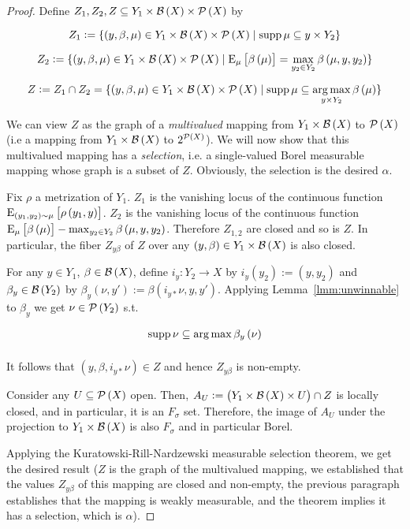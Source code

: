 \begin{proof}

Define ${Z_1, Z_2, Z \subseteq Y_1 \times \mathcal{B}\left(X\right) \times \mathcal{P}\left(X\right)}$ by

$${Z_1:=\{\left(y,\beta,\mu\right) \in Y_1 \times \mathcal{B}\left(X\right) \times \mathcal{P}\left(X\right) \mid \operatorname{supp} \mu \subseteq y \times Y_2\}}$$

$${Z_2:=\{\left(y,\beta,\mu\right) \in Y_1 \times \mathcal{B}\left(X\right) \times \mathcal{P}\left(X\right) \mid \operatorname{E}_\mu\left[\beta\left(\mu\right)\right] = \max_{y_2 \in Y_2} \beta\left(\mu,y,y_2\right)\}}$$

$${Z:=Z_1 \cap Z_2 =\{\left(y,\beta,\mu\right) \in Y_1 \times \mathcal{B}\left(X\right) \times \mathcal{P}\left(X\right) \mid \operatorname{supp} \mu \subseteq \underset{y \times Y_2}{\operatorname{arg\,max}}\, \beta\left(\mu\right)\}}$$

We can view ${Z}$ as the graph of a \emph{multivalued} mapping from ${Y_1 \times \mathcal{B}\left(X\right)}$ to ${\mathcal{P}\left(X\right)}$ (i.e a mapping from ${Y_1 \times \mathcal{B}\left(X\right)}$ to $2^{\mathcal{P}\left(X\right)}$). We will now show that this multivalued mapping has a \emph{selection}, i.e. a single-valued Borel measurable mapping whose graph is a subset of $Z$. Obviously, the selection is the desired ${\alpha}$.

Fix $\rho$ a metrization of $Y_1$. $Z_1$ is the vanishing locus of the continuous function $\operatorname{E}_{\left(y_1, y_2\right) \sim \mu}\left[\rho\left(y_1,y\right)\right]$. $Z_2$ is the vanishing locus of the continuous function $\operatorname{E}_\mu\left[\beta\left(\mu\right)\right] - \max_{y_2 \in Y_2} \beta\left(\mu,y,y_2\right)$. Therefore $Z_{1,2}$ are closed and so is $Z$. In particular, the fiber ${Z_{y\beta}}$ of ${Z}$ over any ${\left(y,\beta\right) \in Y_1 \times \mathcal{B}\left(X\right)}$ is also closed. 

For any ${y \in Y_1}$, ${\beta \in \mathcal{B}\left(X\right)}$, define ${i_y: Y_2 \rightarrow X}$ by ${i_y\left(y_2\right):=\left(y,y_2\right)}$ and ${\beta_y \in \mathcal{B}\left(Y_{2}\right)}$ by $\beta_y\left(\nu,y'\right):=\beta\left(i_{y*}\nu,y,y'\right)$. Applying Lemma~\ref{lmm:unwinnable} to ${\beta_y}$ we get ${\nu \in \mathcal{P}\left(Y_2\right)}$ s.t.

$$\operatorname{supp} \nu \subseteq \underset{}{\operatorname{arg\,max}}\, \beta_y\left(\nu\right)$$

It follows that ${\left(y,\beta,i_{y*}\nu\right) \in Z}$ and hence ${Z_{y\beta}}$ is non-empty.

Consider any ${U \subseteq \mathcal{P}\left(X\right)}$ open. Then, ${A_U:=\left(Y_{1} \times \mathcal{B}\left(X\right) \times U\right) \cap Z}$ is locally closed, and in particular, it is an ${F_\sigma}$ set. Therefore, the image of ${A_U}$ under the projection to ${Y_{1} \times \mathcal{B}\left(X\right)}$ is also ${F_\sigma}$ and in particular Borel. 

Applying the Kuratowski-Rill-Nardzewski measurable selection theorem, we get the desired result ($Z$ is the graph of the multivalued mapping, we established that the values $Z_{y\beta}$ of this mapping are closed and non-empty, the previous paragraph establishes that the mapping is weakly measurable, and the theorem implies it has a selection, which is $\alpha$).
\end{proof}

